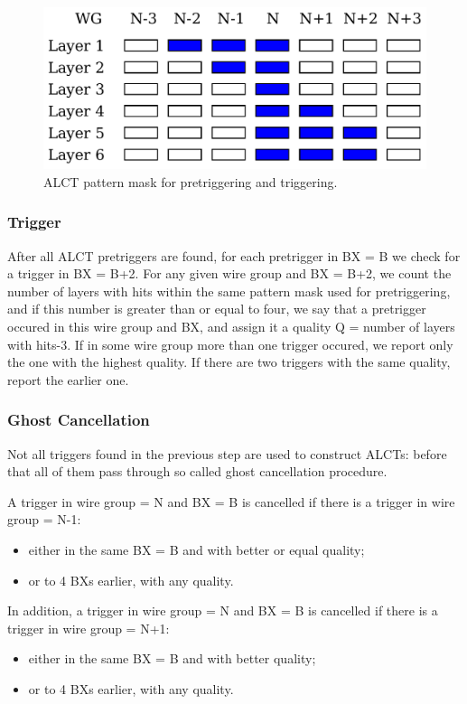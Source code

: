 \begin{figure}[tbh]
        \begin{center}
                \includegraphics[width=0.45\linewidth]{figures/alct_pretrigger.pdf}
                \caption{ALCT pattern mask for pretriggering and triggering.}
                \label{fig:alct_pretrigger}
        \end{center}
\end{figure}

\subsubsection{Trigger}

After all ALCT pretriggers are found, for each pretrigger in BX = B we check for a trigger in BX = B+2. For any given wire group and BX = B+2, we count the number of layers with hits within the same pattern mask used for pretriggering, and if this number is greater than or equal to four, we say that a pretrigger occured in this wire group and BX, and assign it a quality Q = number of layers with hits-3. If in some wire group more than one trigger occured, we report only the one with the highest quality. If there are two triggers with the same quality, report the earlier one.

\subsubsection{Ghost Cancellation}

Not all triggers found in the previous step are used to construct ALCTs: before that all of them pass through so called ghost cancellation procedure.

A trigger in wire group = N and BX = B is cancelled if there is a trigger in wire group = N-1:
\begin{itemize}
    \item either in the same BX = B and with better or equal quality;
    \item or to 4 BXs earlier, with any quality.
\end{itemize}

In addition, a trigger in wire group = N and BX = B is cancelled if there is a trigger in wire group = N+1:
\begin{itemize}
    \item either in the same BX = B and with better quality;
    \item or to 4 BXs earlier, with any quality.
\end{itemize}

